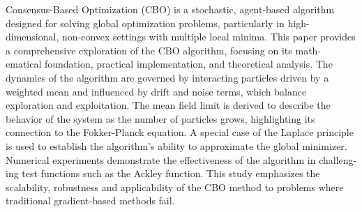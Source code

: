 Consensus-Based Optimization (CBO) is a stochastic, agent-based algorithm designed for solving global optimization problems, particularly in high-dimensional, non-convex settings with multiple local minima. This paper provides a comprehensive exploration of the CBO algorithm, focusing on its math- ematical foundation, practical implementation, and theoretical analysis. The dynamics of the algorithm are governed by interacting particles driven by a weighted mean and influenced by drift and noise terms, which balance exploration and exploitation. The mean field limit is derived to describe the behavior of the system as the number of particles grows, highlighting its connection to the Fokker-Planck equation. A special case of the Laplace principle is used to establish the algorithm’s ability to approximate the global minimizer. Numerical experiments demonstrate the effectiveness of the algorithm in challeng- ing test functions such as the Ackley function. This study emphasizes the scalability, robustness and applicability of the CBO method to problems where traditional gradient-based methods fail.